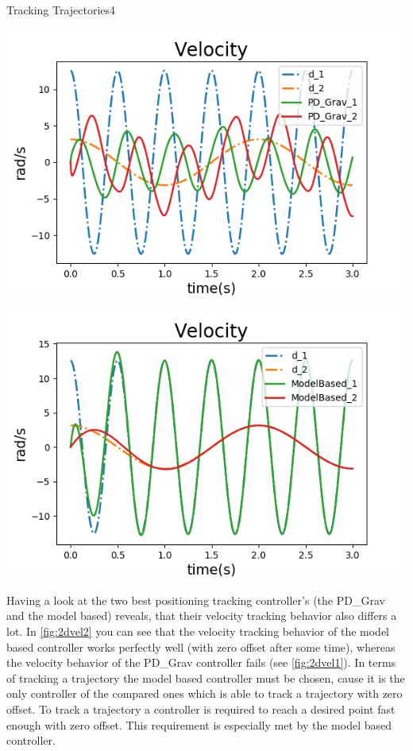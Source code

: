 \begin{questions}
\begin{question}{Tracking Trajectories}{4}
\begin{answer}
				\noindent\begin{minipage}{.5\textwidth}
					\centering
						\includegraphics[width=1\textwidth]{img/2dvel1.png} 
					\label{fig:2dvel1}            
				\end{minipage}%
				\begin{minipage}{.5\textwidth}
					\centering
					\includegraphics[width=1\textwidth]{img/2dvel2.png} 
					\label{fig:2dvel2}               
				\end{minipage}
				
				Having a look at the two best positioning tracking controller's (the PD\_Grav and the model based) reveals, that their velocity tracking behavior also differs a lot. In \ref{fig:2dvel2} you can see that the velocity tracking behavior of the model based controller works perfectly well (with zero offset after some time), whereas the velocity behavior of the PD\_Grav controller fails (see \ref{fig:2dvel1}). In terms of tracking a trajectory the model based controller must be chosen, cause it is the only controller of the compared ones which is able to track a trajectory with zero offset. To track a trajectory a controller is required to reach a desired point fast enough with zero offset. This requirement is especially met by the model based controller.
	\end{answer}
		

\end{question}
\end{questions}
